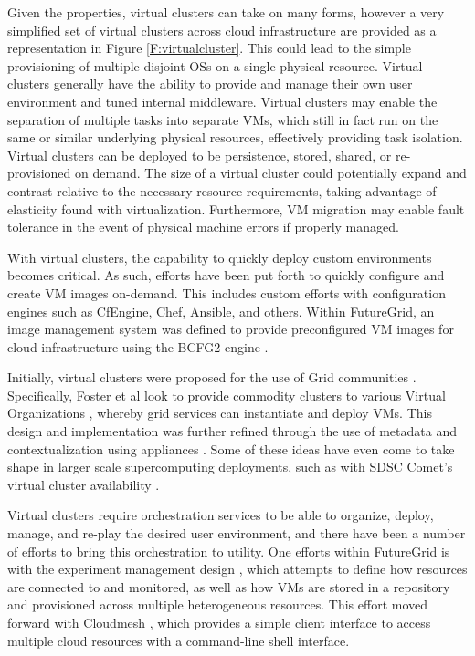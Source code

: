 Given the properties, virtual clusters can take on many forms, however a very simplified set of virtual clusters across cloud infrastructure are provided as a representation in Figure \ref{F:virtualcluster}. This could lead to the simple provisioning of multiple disjoint OSs on a single physical resource. Virtual clusters generally have the ability to provide and manage their own user environment and tuned internal middleware.  Virtual clusters may enable the separation of multiple tasks into separate VMs, which still in fact run on the same or similar underlying physical resources, effectively providing task isolation.  Virtual clusters can be deployed to be persistence, stored, shared, or re-provisioned on demand.  The size of a virtual cluster could potentially expand and contrast relative to the necessary resource requirements, taking advantage of elasticity found with virtualization. Furthermore, VM migration may enable fault tolerance in the event of physical machine errors if properly managed. 

With virtual clusters, the capability to quickly deploy custom environments becomes critical. As such, efforts have been put forth to quickly configure and create VM images on-demand. This includes custom efforts with configuration engines such as CfEngine, Chef, Ansible, and others. Within FutureGrid, an image management system was defined to provide preconfigured VM images for cloud infrastructure using the BCFG2 engine \cite{Diaz2011cca}.

Initially, virtual clusters were proposed for the use of Grid communities \cite{Foster2006}. Specifically, Foster et al look to provide commodity clusters to various Virtual Organizations \cite{foster2001}, whereby grid services can instantiate and deploy VMs. This design and implementation was further refined through the use of metadata and contextualization using appliances \cite{keahey2008contextualization}. Some of these ideas have even come to take shape in larger scale supercomputing deployments, such as with SDSC Comet's virtual cluster availability \cite{Moore2014}.

Virtual clusters require orchestration services to be able to organize, deploy, manage, and re-play the desired user environment, and there have been a number of efforts to bring this orchestration to utility. One efforts within FutureGrid is with the experiment management design \cite{las2010gce}, which attempts to define how resources are connected to and monitored, as well as how VMs are stored in a repository and provisioned across multiple heterogeneous resources. This effort moved forward with  Cloudmesh \cite{von2014cloudmesh}, which provides a simple client interface to access multiple cloud resources with a command-line shell interface. 

